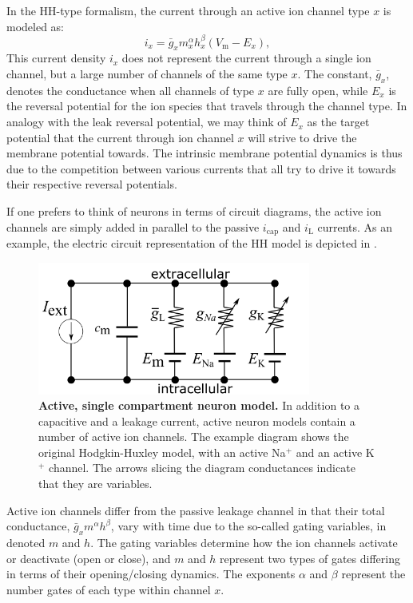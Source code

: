 In the HH-type formalism, the current through an active ion channel type $x$ is modeled as:
\begin{equation}
i_x = \bar{g}_x m_x^{\alpha} h_x^{\beta}(V_\mathrm{m}-E_x), 
\label{eq:Neuron:HHform}
\end{equation}
This current density $i_x$ does not represent the current through a single ion channel, but a large number of channels of the same type $x$. The constant, $\bar{g}_x$, denotes the conductance when all channels of type $x$ are fully open, while $E_x$ is the reversal potential for the ion species that travels through the channel type. In analogy with the leak reversal potential, we may think of $E_x$ as the target potential that the current through ion channel $x$ will strive to drive the membrane potential towards. The intrinsic membrane potential dynamics is thus due to the competition between various currents that all try to drive it towards their respective reversal potentials. 

If one prefers to think of neurons in terms of circuit diagrams, the active ion channels are simply added in parallel to the passive $i_{\mathrm{cap}}$ and $i_{\mathrm{L}}$ currents. As an example, the electric circuit representation of the HH model is depicted in .

\begin{figure}[!ht]
\begin{center}
\includegraphics[width=0.8\textwidth]{Figures/Neuron/HHmodel.png}
\end{center}
\caption[]{\textbf{Active, single compartment neuron model.}  In addition to a capacitive and a leakage current, active neuron models contain a number of active ion channels. The example diagram shows the original Hodgkin-Huxley model, with an active Na$^+$ and an active K$^+$ channel. The arrows slicing the diagram conductances indicate that they are variables.}
\label{fig:Neuron:HH}
\end{figure}

Active ion channels differ from the passive leakage channel in that their total conductance, $\bar{g}_{x} m^{\alpha} h^{\beta}$, vary with time due to the so-called gating variables, in  denoted $m$ and $h$. The gating variables determine how the ion channels activate or deactivate (open or close), and $m$ and $h$ represent two types of gates differing in terms of their opening/closing dynamics. The exponents $\alpha$ and $\beta$ represent the number gates of each type within channel $x$. 

